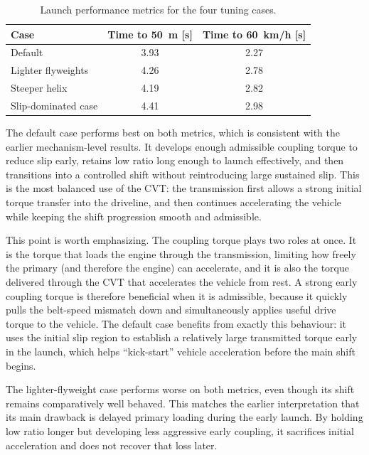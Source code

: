 \documentclass[11pt]{article}
\numberwithin{equation}{section}
\begin{document}
\begin{table}[H]
\centering
\caption{Launch performance metrics for the four tuning cases.}
\label{tab:launch_performance}
\small
\begin{tabular}{@{}lcc@{}}
\toprule
\textbf{Case} & \textbf{Time to \SI{50}{m} [s]} & \textbf{Time to \SI{60}{km/h} [s]} \\
\midrule
Default & 3.93 & 2.27 \\
Lighter flyweights & 4.26 & 2.78 \\
Steeper helix & 4.19 & 2.82 \\
Slip-dominated case & 4.41 & 2.98 \\
\bottomrule
\end{tabular}
\end{table}

The default case performs best on both metrics, which is consistent with the
earlier mechanism-level results. It develops enough admissible coupling torque
to reduce slip early, retains low ratio long enough to launch effectively, and
then transitions into a controlled shift without reintroducing large sustained
slip. This is the most balanced use of the CVT: the transmission first allows a
strong initial torque transfer into the driveline, and then continues
accelerating the vehicle while keeping the shift progression smooth and
admissible.

This point is worth emphasizing. The coupling torque plays two roles at once.
It is the torque that loads the engine through the transmission, limiting how
freely the primary (and therefore the engine) can accelerate, and it is also the torque delivered through
the CVT that accelerates the vehicle from rest. A strong early coupling torque
is therefore beneficial when it is admissible, because it quickly pulls the
belt-speed mismatch down and simultaneously applies useful drive torque to the
vehicle. The default case benefits from exactly this behaviour: it uses the
initial slip region to establish a relatively large transmitted torque early in
the launch, which helps ``kick-start'' vehicle acceleration before the main
shift begins.

The lighter-flyweight case performs worse on both metrics, even though its
shift remains comparatively well behaved. This matches the earlier
interpretation that its main drawback is delayed primary loading during the
early launch. By holding low ratio longer but developing less aggressive early
coupling, it sacrifices initial acceleration and does not recover that loss
later.
\end{document}
